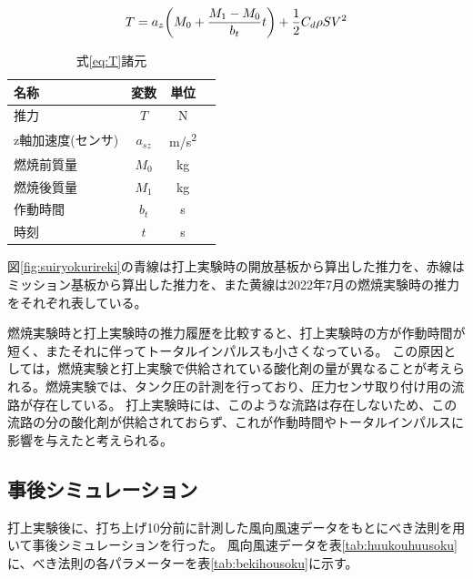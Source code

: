 \documentclass[a4paper,11pt,uplatex]{jsarticle}
\begin{document}
\begin{equation}
	T = a_z\qty(M_0 + \frac{M_1-M_0}{b_t}t)+\frac{1}{2}C_d \rho S V^2
	\label{eq:T}
\end{equation}

\begin{table}[H]
	\centering
	\caption{式\eqref{eq:T}諸元}
	\label{tab:eqshogen}
	\begin{tabular}{lccr}
		\toprule
		名称         & 変数       & 単位         \\
		\midrule
		推力         & $T$      & \si{N}     \\
		z軸加速度(センサ) & $a_{sz}$ & \si{m/s^2} \\
		燃焼前質量      & $M_0$    & \si{kg}    \\
		燃焼後質量      & $M_1$    & \si{kg}    \\
		作動時間       & $b_t$    & \si{s}     \\
		時刻         & $t$      & \si{s}     \\
		\bottomrule
	\end{tabular}
\end{table}

図\ref{fig:suiryokurireki}の青線は打上実験時の開放基板から算出した推力を、赤線はミッション基板から算出した推力を、また黄線は2022年7月の燃焼実験時の推力をそれぞれ表している。

燃焼実験時と打上実験時の推力履歴を比較すると、打上実験時の方が作動時間が短く、またそれに伴ってトータルインパルスも小さくなっている。
この原因としては，燃焼実験と打上実験で供給されている酸化剤の量が異なることが考えられる。燃焼実験では、タンク圧の計測を行っており、圧力センサ取り付け用の流路が存在している。
打上実験時には、このような流路は存在しないため、この流路の分の酸化剤が供給されておらず、これが作動時間やトータルインパルスに影響を与えたと考えられる。

\subsection{事後シミュレーション}
打上実験後に、打ち上げ10分前に計測した風向風速データをもとにべき法則を用いて事後シミュレーションを行った。
風向風速データを表\ref{tab:huukouhuusoku}に、べき法則の各パラメーターを表\ref{tab:bekihousoku}に示す。
\end{document}
